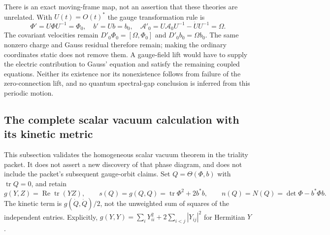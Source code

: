 There is an exact moving-frame map, not an assertion that these theories
are unrelated. With $U(t)=O(t)^*$ the gauge transformation rule is
\[
 \Phi'=U\Phi U^{-1}=\Phi_0,\quad b'=Ub=b_0,\quad
 \mathcal A'_0=U\mathcal A_0U^{-1}-\dot U U^{-1}=\Omega.
\]
The covariant velocities remain
$D'_0\Phi_0=[\Omega,\Phi_0]$ and $D'_0b_0=\Omega b_0$.
The same nonzero charge and Gauss residual therefore remain; making the
ordinary coordinates static does not remove them. A gauge-field lift
would have to supply the electric contribution to Gauss' equation and
satisfy the remaining coupled equations. Neither its existence nor its
nonexistence follows from failure of the zero-connection lift, and no
quantum spectral-gap conclusion is inferred from this periodic motion.

\subsection{The complete scalar vacuum calculation with its kinetic metric}

This subsection validates the homogeneous scalar vacuum theorem in the
triality packet. It does not assert a new discovery of that phase diagram,
and does not include the packet's subsequent gauge-orbit claims.
Set $Q=\Theta(\Phi,b)$ with $\operatorname{tr}Q=0$, and retain
\[
 g(Y,Z)=\operatorname{Re}\operatorname{tr}(YZ),\qquad
 s(Q)=g(Q,Q)=\operatorname{tr}\Phi^2+2b^*b,\qquad
 n(Q)=N(Q)=\det\Phi-b^*\Phi b.
\]
The kinetic term is $g(\dot Q,\dot Q)/2$, not the unweighted sum of
squares of the independent entries. Explicitly,
$g(Y,Y)=\sum_iY_{ii}^2+2\sum_{i<j}|Y_{ij}|^2$ for Hermitian $Y$.

